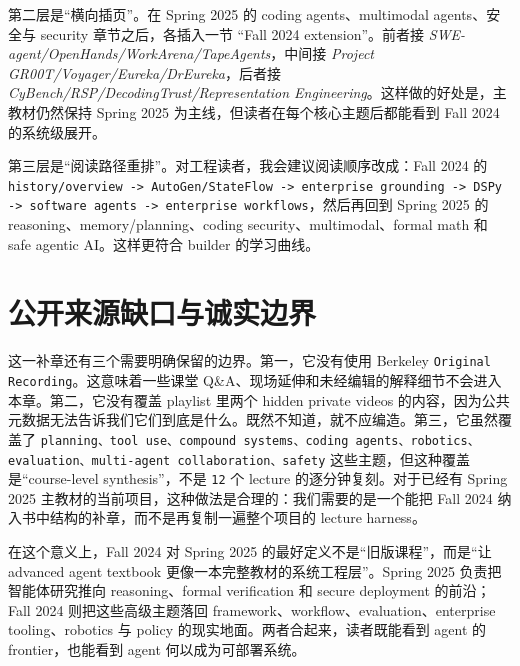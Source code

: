 第二层是“横向插页”。在 Spring 2025 的 coding agents、multimodal agents、安全与 security 章节之后，各插入一节 “Fall 2024 extension”。前者接 \textit{SWE-agent/OpenHands/WorkArena/TapeAgents}，中间接 \textit{Project GR00T/Voyager/Eureka/DrEureka}，后者接 \textit{CyBench/RSP/DecodingTrust/Representation Engineering}。这样做的好处是，主教材仍然保持 Spring 2025 为主线，但读者在每个核心主题后都能看到 Fall 2024 的系统级展开。

第三层是“阅读路径重排”。对工程读者，我会建议阅读顺序改成：Fall 2024 的 \texttt{history/overview -> AutoGen/StateFlow -> enterprise grounding -> DSPy -> software agents -> enterprise workflows}，然后再回到 Spring 2025 的 reasoning、memory/planning、coding security、multimodal、formal math 和 safe agentic AI。这样更符合 builder 的学习曲线。

\section{公开来源缺口与诚实边界}

这一补章还有三个需要明确保留的边界。第一，它没有使用 Berkeley \texttt{Original Recording}。这意味着一些课堂 Q\&A、现场延伸和未经编辑的解释细节不会进入本章。第二，它没有覆盖 playlist 里两个 hidden private videos 的内容，因为公共元数据无法告诉我们它们到底是什么。既然不知道，就不应编造。第三，它虽然覆盖了 \texttt{planning、tool use、compound systems、coding agents、robotics、evaluation、multi-agent collaboration、safety} 这些主题，但这种覆盖是“course-level synthesis”，不是 \texttt{12} 个 lecture 的逐分钟复刻。对于已经有 Spring 2025 主教材的当前项目，这种做法是合理的：我们需要的是一个能把 Fall 2024 纳入书中结构的补章，而不是再复制一遍整个项目的 lecture harness。

在这个意义上，Fall 2024 对 Spring 2025 的最好定义不是“旧版课程”，而是“让 advanced agent textbook 更像一本完整教材的系统工程层”。Spring 2025 负责把智能体研究推向 reasoning、formal verification 和 secure deployment 的前沿；Fall 2024 则把这些高级主题落回 framework、workflow、evaluation、enterprise tooling、robotics 与 policy 的现实地面。两者合起来，读者既能看到 agent 的 frontier，也能看到 agent 何以成为可部署系统。
